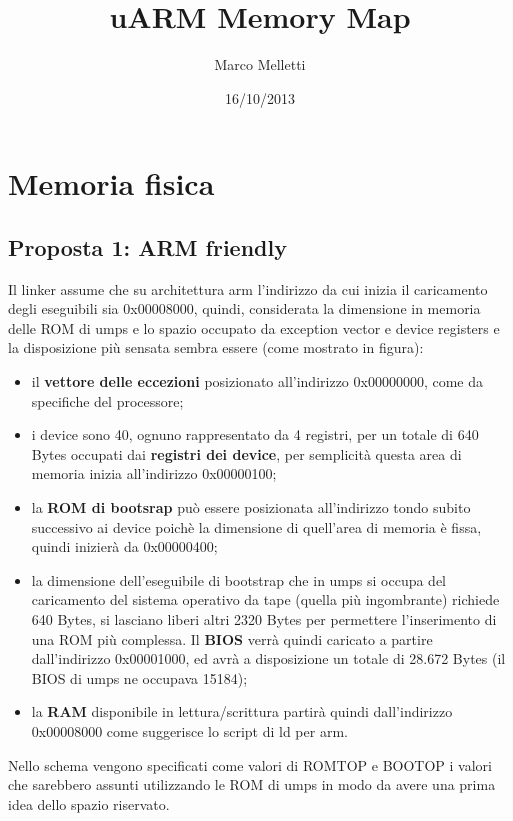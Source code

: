 \documentclass[a4paper,12pt]{article}
\title{uARM Memory Map}
\author{Marco Melletti}
\date{16/10/2013}
\newcommand{\bold}[1]{{\textbf{#1}}}
\begin{document}
\section{Memoria fisica}

\subsection{Proposta 1: ARM friendly}

Il linker assume che su architettura arm l'indirizzo da cui inizia il caricamento degli eseguibili sia 0x00008000, quindi, considerata la dimensione in memoria delle ROM di umps e lo spazio occupato da exception vector e device registers e la disposizione pi\`u sensata sembra essere (come mostrato in figura):

\begin{itemize}
\item il \textbf{vettore delle eccezioni} posizionato all'indirizzo 0x00000000, come da specifiche del processore;
\item i device sono 40, ognuno rappresentato da 4 registri, per un totale di 640 Bytes occupati dai \textbf{registri dei device}, per semplicit\`a questa area di memoria inizia all'indirizzo 0x00000100;
\item la \textbf{ROM di bootsrap} pu\`o essere posizionata all'indirizzo tondo subito successivo ai device poich\`e la dimensione di quell'area di memoria \`e fissa, quindi inizier\`a da 0x00000400; 
\item la dimensione dell'eseguibile di bootstrap che in umps si occupa del caricamento del sistema operativo da tape (quella pi\`u ingombrante) richiede 640 Bytes, si lasciano liberi altri 2320 Bytes per permettere l'inserimento di una ROM pi\`u complessa. Il \textbf{BIOS} verr\`a quindi caricato a partire dall'indirizzo 0x00001000, ed avr\`a a disposizione un totale di 28.672 Bytes (il BIOS di umps ne occupava 15184);
\item la \bold{RAM} disponibile in lettura/scrittura partir\`a quindi dall'indirizzo 0x00008000 come suggerisce lo script di ld per arm.
\end{itemize}

Nello schema vengono specificati come valori di ROMTOP e BOOTOP i valori che sarebbero assunti utilizzando le ROM di umps in modo da avere una prima idea dello spazio riservato.

\begin{figure}
\def\svgwidth{\columnwidth}

\end{figure}
\end{document}
